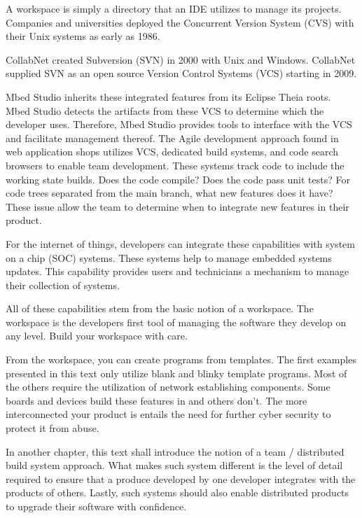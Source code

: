 \documentclass{article}
\begin{document}
A workspace is simply a directory that an IDE utilizes to manage its projects.  Companies and universities deployed the Concurrent Version System (CVS) with their Unix systems as early as 1986.  

CollabNet created Subversion (SVN) in 2000 with Unix and Windows.  CollabNet supplied SVN as an open source  Version Control Systems (VCS) starting in 2009.

Mbed Studio inherits these integrated features from its Eclipse Theia roots.
Mbed Studio detects the artifacts from these VCS to determine which the developer uses. Therefore, Mbed Studio provides tools to interface with the VCS and facilitate management thereof.  The Agile development approach found in web application shops utilizes VCS, dedicated build systems, and code search browsers to enable team development.  These systems track code to include the working state builds.  Does the code compile?  Does the code pass unit tests?  For code trees separated from the main branch, what new features does it have?   These issue allow the team to determine when to integrate new features in their product.

For the internet of things, developers can integrate these capabilities with system on a chip (SOC) systems.  These systems help to manage embedded systems updates.  This capability provides users and technicians a mechanism to manage their collection of systems. 

All of these capabilities stem from the basic notion of a workspace.  The workspace is the developers first tool of managing the software they develop on any level.  Build your workspace with care.

From the workspace, you can create programs from templates.  The first examples presented in this text only utilize blank and blinky template programs.  Most of the others require the utilization of network establishing components.  Some boards and devices build these features in and others don't.  The more interconnected your product is entails the need for further cyber security to protect it from abuse.

\newpage
In another chapter, this text shall introduce the notion of a team / distributed build system approach.  What makes such system different is the level of detail required to ensure that a produce developed by one developer integrates with the products of others.  Lastly, such systems should also enable distributed products to upgrade their software with confidence. 
\end{document}
